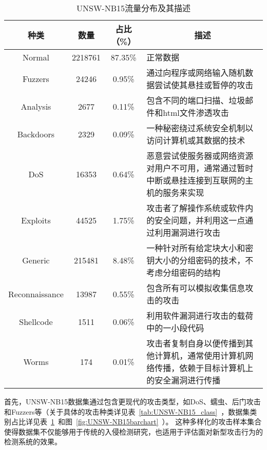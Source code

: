 \begin{table}[htbp]
  \caption{UNSW-NB15流量分布及其描述}
  \label{tab:UNSW-NB15_distribution}
  \begin{tabularx}{\textwidth}{@{}cccX@{}}
    \toprule
      \multicolumn{1}{c}{\textbf{种类}} & \multicolumn{1}{c}{\textbf{数量}} & \multicolumn{1}{c}{\textbf{占比（\%）}} & \multicolumn{1}{c}{\textbf{描述}}\\
    \midrule
  Normal & 2218761 & 87.35\% & 正常数据 \\

  Fuzzers & 24246 & 0.95\% & 通过向程序或网络输入随机数据尝试使其悬挂或暂停的攻击 \\

  Analysis & 2677 & 0.11\% & 包含不同的端口扫描、垃圾邮件和html文件渗透攻击 \\

  Backdoors & 2329 & 0.09\% & 一种秘密绕过系统安全机制以访问计算机或其数据的技术 \\

  DoS & 16353 & 0.64\% & 恶意尝试使服务器或网络资源对用户不可用，通常通过暂时中断或悬挂连接到互联网的主机的服务来实现 \\

  Exploits & 44525 & 1.75\% & 攻击者了解操作系统或软件内的安全问题，并利用这一点通过利用漏洞进行攻击 \\

  Generic & 215481 & 8.48\% & 一种针对所有给定块大小和密钥大小的分组密码的技术，不考虑分组密码的结构 \\

  Reconnaissance & 13987 & 0.55\% & 包含所有可以模拟收集信息攻击的攻击 \\

  Shellcode & 1511 & 0.06\% & 利用软件漏洞进行攻击的载荷中的一小段代码 \\

  Worms & 174 & 0.01\% & 攻击者复制自身以便传播到其他计算机，通常使用计算机网络传播，依赖于目标计算机上的安全漏洞进行传播 \\
  \bottomrule
  \end{tabularx}
  \end{table}

首先，UNSW-NB15数据集通过包含更现代的攻击类型，如DoS、蠕虫、后门攻击和Fuzzers等（关于具体的攻击种类详见表~\ref{tab:UNSW-NB15_class}~，数据集类别占比详见表~\ref{tab:UNSW-NB15_distribution}~和图~\ref{fig:UNSW-NB15barchart}~）。
这种多样化的攻击样本集合使得数据集不仅能够用于传统的入侵检测研究，也适用于评估面对新型攻击行为的检测系统的效果。

